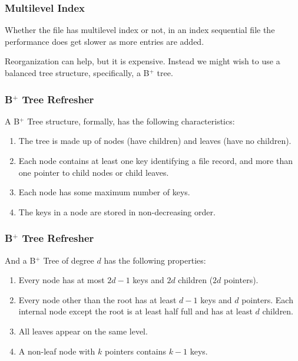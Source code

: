 \begin{frame}
\frametitle{Multilevel Index}
Whether the file has multilevel index or not, in an index sequential file the performance does get slower as more entries are added. 

Reorganization can help, but it is expensive. Instead we might wish to use a balanced tree structure, specifically, a B$^{+}$ tree.


\end{frame}

\begin{frame}
\frametitle{B$^{+}$ Tree Refresher}

A B$^{+}$ Tree structure, formally, has the following characteristics:

\begin{enumerate}
	\item The tree is made up of nodes (have children) and leaves (have no children).
	\item Each node contains at least one key identifying a file record, and more than one pointer to child nodes or child leaves.
	\item Each node has some maximum number of keys.
	\item The keys in a node are stored in non-decreasing order.
\end{enumerate}

\end{frame}

\begin{frame}
\frametitle{B$^{+}$ Tree Refresher}

And a B$^{+}$ Tree of degree $d$ has the following properties:

\begin{enumerate}
	\item Every node has at most $2d-1$ keys and $2d$ children ($2d$ pointers).
	\item Every node other than the root has at least $d-1$ keys and $d$ pointers. Each internal node except the root is at least half full and has at least $d$ children.
	\item All leaves appear on the same level.
	\item A non-leaf node with $k$ pointers contains $k-1$ keys.
\end{enumerate}


\end{frame}


